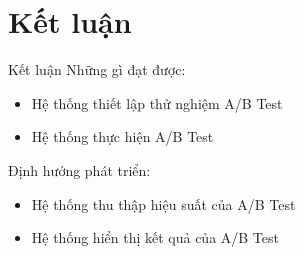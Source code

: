 \section{Kết luận}


\begin{frame}{Kết luận}
	Những gì đạt được:
	\begin{itemize}
		\item Hệ thống thiết lập thử nghiệm A/B Test
		\item Hệ thống thực hiện A/B Test
	\end{itemize}
	Định hướng phát triển:
	\begin{itemize}
		\item Hệ thống thu thập hiệu suất của A/B Test
		\item Hệ thống hiển thị kết quả của A/B Test
	\end{itemize}
\end{frame}


